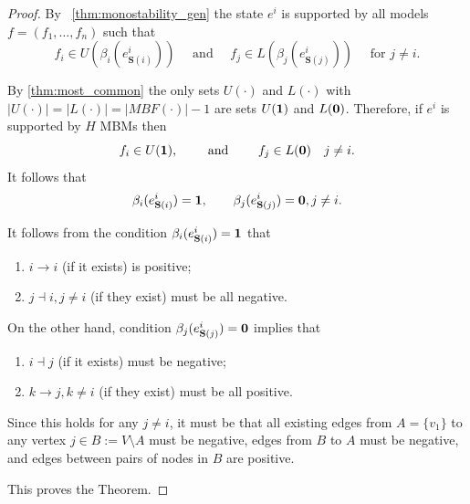 \documentclass[12pt]{amsart}
\newcommand{\bzero}{{\bf 0}}
\newcommand{\bone}{{\bf 1}}
\newcommand{\Sources}{\mathbf{S}}
\theoremstyle{definition}
\begin{document}
\begin{proof}
By ~\cref{thm:monostability_gen} the state $e^i$ is supported by all models $f=(f_1, \ldots, f_n)$ such that 
\[ f_i \in U(\beta_i(e^i_{\Sources(i)})) \quad \mbox{ and }\quad f_j \in L(\beta_j(e^i_{\Sources(j)})) \quad \mbox{ for } j\not= i.\]

By \cref{thm:most_common} the only sets $U(\cdot)$ and $L(\cdot)$ with 
$|U(\cdot)|=|L(\cdot)| = |MBF(\cdot)| - 1$ are sets 
$U(\bone) $ and $L(\bzero)$.
Therefore, if $e^i$ is supported by $H$ MBMs then 
        \[f_i \in U(\bone), \qquad \mbox{ and } \qquad f_j\in L(\bzero) \quad j\not=i. \]
        It follows that 
        \[ \beta_i(e^i_{\Sources(i)})= \bone,\qquad \beta_j(e^i_{\Sources(j)}) = \bzero, j \not = i.\]

It follows from the condition $\beta_i(e^i_{\Sources(i)})= \bone$ that 
\begin{enumerate}
\item 
$i \to i$ (if it exists) is positive;
\item $j \dashv i, j \not = i$ (if they exist) must be all negative.
\end{enumerate}

On the other hand, condition $\beta_j(e^i_{\Sources(j)})= \bzero$ implies that 
\begin{enumerate}
\item 
$i \dashv j$ (if it exists) must be negative;
\item $k \to j, k \not = i$ (if they exist) must be all positive.
\end{enumerate}
Since this holds for any $j \not = i$, it must be that all existing edges from $A=\{v_1\}$ to any vertex $j \in B:= V\setminus A$ must be negative, edges from $B$ to $A$ must be negative, and edges between pairs of nodes in $B$ are positive. 

This proves the Theorem.
\end{proof}
\end{document}
